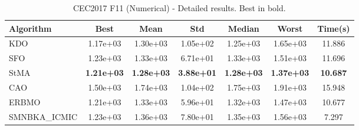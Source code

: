 \begin{table}[H]
\centering\small
\caption{CEC2017 F11 (Numerical) - Detailed results. Best in bold.}
\label{tab:cec2017_F11}
\begin{tabular}{lcccccc}
\toprule
\textbf{Algorithm} & \textbf{Best} & \textbf{Mean} & \textbf{Std} & \textbf{Median} & \textbf{Worst} & \textbf{Time(s)} \\
\midrule
KDO & 1.17e+03 & 1.30e+03 & 1.05e+02 & 1.25e+03 & 1.65e+03 & 11.886 \\
SFO & 1.23e+03 & 1.33e+03 & 6.71e+01 & 1.33e+03 & 1.51e+03 & 11.696 \\
StMA & \textbf{1.21e+03} & \textbf{1.28e+03} & \textbf{3.88e+01} & \textbf{1.28e+03} & \textbf{1.37e+03} & \textbf{10.687} \\
CAO & 1.50e+03 & 1.74e+03 & 1.04e+02 & 1.75e+03 & 1.91e+03 & 15.948 \\
ERBMO & 1.21e+03 & 1.33e+03 & 5.96e+01 & 1.32e+03 & 1.47e+03 & 10.677 \\
SMNBKA_ICMIC & 1.23e+03 & 1.36e+03 & 7.80e+01 & 1.35e+03 & 1.56e+03 & 7.297 \\
\bottomrule
\end{tabular}
\end{table}
